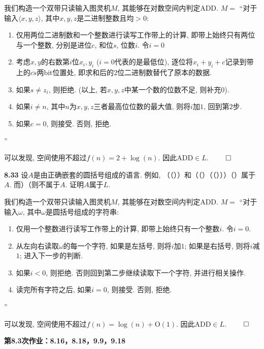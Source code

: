 \documentclass[UTF8]{report}
\newcommand{\problem}[1]{{\setlength{\parskip}{10pt}\noindent \bf{#1}}}
\renewenvironment{proof}{{\setlength{\parskip}{7pt}\noindent\hskip 2em \bf 证明 \quad}}{\hfill$\qed$\par}
\renewcommand{\O}{\mathrm{O}}
\newcommand{\ADD}{\mathrm{ADD}}
\begin{document}
\begin{proof}
    我们构造一个双带只读输入图灵机$M$, 其能够在对数空间内判定$\ADD$. $M =$ ``对于输入$\langle x,y,z \rangle$, 其中$x,y,z$是二进制整数且均$>0$:
    \begin{enumerate}
        \item 仅用两位二进制数和一个整数进行读写工作带上的计算, 即带上始终只有两位与一个整数, 分别是进位$c$, 和位$s$, 位数$i$. 令$i=0$
        \item 考虑$x, y$的右数第$i$位$x_i,y_i$ ($i=0$代表的是最低位), 逐位将$x_i+y_i+c$记录到带上的$\overline{cs}$两bit位置处, 即求和后的$2$位二进制数替代了原本的数据.
        \item 如果$s \neq z_i$, 则拒绝. (以上, 若$x,y,z$中某一个数的位数不足, 则补充$0$).
        \item 如果$i \neq n$, 其中$n$为$x,y,z$三者最高位位数的最大值, 则将$i$加$1$, 回到第$2$步.
        \item 如果$c=0$, 则接受. 否则, 拒绝.
    \end{enumerate}
    ''

    可以发现, 空间使用不超过$f(n) = 2 + \log(n)$. 因此$\ADD \in L$.
\end{proof}


\problem{8.33} 设$A$是由正确嵌套的圆括号组成的语言. 例如, （（））和（（）（（）））（）属于$A$. 而）（则不属于$A$. 证明$A$属于$L$. 

\begin{proof}
    我们构造一个双带只读输入图灵机$M$, 其能够在对数空间内判定$\ADD$. $M =$ ``对于输入$\omega$, 其中$\omega$是圆括号组成的字符串:
    \begin{enumerate}
        \item 仅用一个整数进行读写工作带上的计算, 即带上始终只有一个整数$i$. 令$i=0$.
        \item 从左向右读取$\omega$的每一个字符, 如果是左括号, 则将$i$加$1$; 如果是右括号, 则将$i$减$1$; 进入下一步的判断.
        \item 如果$i < 0$, 则拒绝. 否则回到第二步继续读取下一个字符, 并进行相关操作.
        \item 读完所有字符之后, 如果$i = 0$, 则接受. 否则, 拒绝.
    \end{enumerate}
    ''

    可以发现, 空间使用不超过$f(n) = \log(n) + \O(1)$. 因此$\ADD \in L$.
\end{proof}

\newpage

\textbf{第8.3次作业：8.16，8.18，9.9，9.18}
\end{document}
